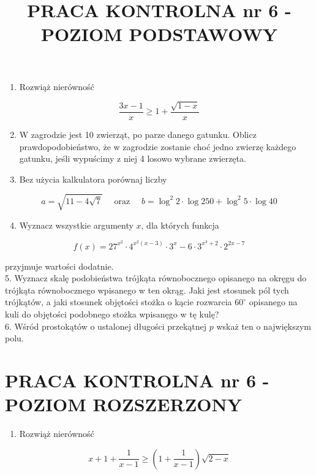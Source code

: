 \documentclass[10pt]{article}
\title{PRACA KONTROLNA nr 6 - POZIOM PODSTAWOWY }
\author{}
\date{}
\begin{document}
\maketitle
\begin{enumerate}
  \item Rozwiąż nierówność
\end{enumerate}

$$
\frac{3 x-1}{x} \geqslant 1+\frac{\sqrt{1-x}}{x}
$$

\begin{enumerate}
  \setcounter{enumi}{1}
  \item W zagrodzie jest 10 zwierząt, po parze danego gatunku. Oblicz prawdopodobieństwo, że w zagrodzie zostanie choć jedno zwierzę każdego gatunku, jeśli wypuścimy z niej 4 losowo wybrane zwierzęta.
  \item Bez użycia kalkulatora porównaj liczby
\end{enumerate}

$$
a=\sqrt{11-4 \sqrt{7}} \quad \text { oraz } \quad b=\log ^{2} 2 \cdot \log 250+\log ^{2} 5 \cdot \log 40
$$

\begin{enumerate}
  \setcounter{enumi}{3}
  \item Wyznacz wszystkie argumenty $x$, dla których funkcja
\end{enumerate}

$$
f(x)=27^{x^{2}} \cdot 4^{x^{2}(x-3)} \cdot 3^{x}-6 \cdot 3^{x^{3}+2} \cdot 2^{2 x-7}
$$

przyjmuje wartości dodatnie.\\
5. Wyznacz skalę podobieństwa trójkąta równobocznego opisanego na okręgu do trójkąta równobocznego wpisanego w ten okrąg. Jaki jest stosunek pól tych trójkątów, a jaki stosunek objętości stożka o kącie rozwarcia $60^{\circ}$ opisanego na kuli do objętości podobnego stożka wpisanęgo w tę kulę?\\
6. Wśród prostokątów o ustalonej długości przekątnej $p$ wskaż ten o największym polu.

\section*{PRACA KONTROLNA nr 6 - POZIOM ROZSZERZONY}
\begin{enumerate}
  \item Rozwiąż nierówność
\end{enumerate}

$$
x+1+\frac{1}{x-1} \geqslant\left(1+\frac{1}{x-1}\right) \sqrt{2-x}
$$
\end{document}
